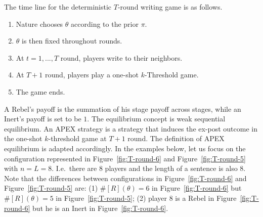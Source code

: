 \documentclass[12pt,letter]{article}
\theoremstyle{definition}
\theoremstyle{remark}
\theoremstyle{claim}
\begin{document}
The time line for the deterministic $T$-round writing game is as follows.
\begin{enumerate}
\item Nature chooses $\theta$ according to the prior $\pi$.
\item $\theta$ is then fixed throughout rounds.
\item At $t=1,...,T$ round, players write to their neighbors. 
\item At $T+1$ round, players play a one-shot $k$-Threshold game.
\item The game ends.
\end{enumerate}
A Rebel's payoff is the summation of his stage payoff across stages, while an Inert's payoff is set to be $1$. The equilibrium concept is weak sequential equilibrium. An APEX strategy is a strategy that induces the ex-post outcome in the one-shot $k$-threshold game at $T+1$ round. The definition of APEX equilibrium is adapted accordingly. In the examples below, let us focus on the configuration represented in Figure~\ref{fig:T-round-6} and Figure~\ref{fig:T-round-5} with $n=L=8$. I.e.~there are 8 players and the length of a sentence is also 8. Note that the differences between configurations in Figure~\ref{fig:T-round-6} and Figure~\ref{fig:T-round-5} are: (1) $\#[R](\theta)=6$ in Figure~\ref{fig:T-round-6} but $\#[R](\theta)=5$ in Figure~\ref{fig:T-round-5}; (2) player 8 is a Rebel in Figure~\ref{fig:T-round-6} but he is an Inert in Figure~\ref{fig:T-round-6}.
\end{document}
